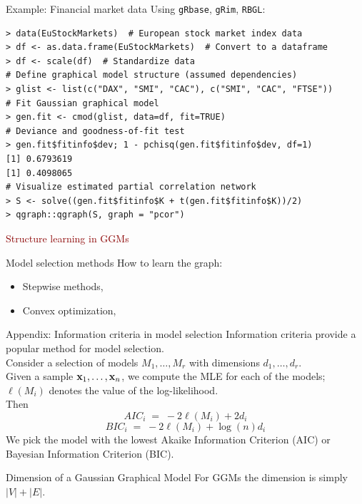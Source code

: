 \documentclass[11pt,handout,aspectratio=169,dvipsnames]{beamer}
\begin{document}
\begin{frame}[fragile]{Example: Financial market data}
	Using \texttt{gRbase}, \texttt{gRim}, \texttt{RBGL}:
\begin{lstlisting}
> data(EuStockMarkets)  # European stock market index data
> df <- as.data.frame(EuStockMarkets)  # Convert to a dataframe
> df <- scale(df)  # Standardize data
# Define graphical model structure (assumed dependencies)
> glist <- list(c("DAX", "SMI", "CAC"), c("SMI", "CAC", "FTSE"))
# Fit Gaussian graphical model
> gen.fit <- cmod(glist, data=df, fit=TRUE)
# Deviance and goodness-of-fit test
> gen.fit$fitinfo$dev; 1 - pchisq(gen.fit$fitinfo$dev, df=1)
[1] 0.6793619
[1] 0.4098065
# Visualize estimated partial correlation network
> S <- solve((gen.fit$fitinfo$K + t(gen.fit$fitinfo$K))/2)  
> qgraph::qgraph(S, graph = "pcor")   \end{lstlisting}
\end{frame}

\begin{frame}{}
\begin{center}
	{\huge \textcolor{DarkRed}{Structure learning in GGMs}}
\end{center}
\end{frame}

\begin{frame}{Model selection methods}
How to learn the graph:\\[.4cm]
\begin{itemize}
	\item Stepwise methods,\\[.4cm]
	\item Convex optimization,\\[.4cm]
\end{itemize}	
\end{frame}


\begin{frame}{Appendix: Information criteria in model selection}
	Information criteria provide a popular method for model selection.\\[3mm] 
	Consider a selection of models $M_1,\ldots,M_r$ with dimensions $d_1,\ldots,d_r$.\\[3mm] 
	Given a sample $\mathbf{x}_1,\ldots,\mathbf{x}_n$, we compute the MLE for each of the models; $\ell(M_i)$ denotes the value of the log-likelihood.\\[3mm] 
	Then
	$$
	AIC_i\;=\;-2 \ell(M_i)+2 d_i
	$$
	$$
	BIC_i\;=\;-2 \ell(M_i)+\log(n) d_i
	$$
	We pick the model with the lowest Akaike Information Criterion (AIC) or Bayesian Information Criterion (BIC).
	\begin{alertblock}{Dimension of a Gaussian Graphical Model}
		For GGMs the dimension is simply $|V|+|E|$.
	\end{alertblock}
\end{frame}
\end{document}
